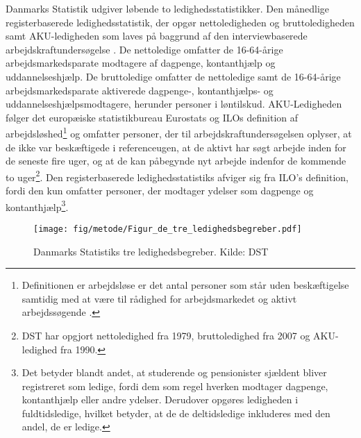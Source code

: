 Danmarks Statistik udgiver løbende to ledighedsstatistikker. Den månedlige registerbaserede ledighedsstatistik, der opgør nettoledigheden og bruttoledigheden samt AKU-ledigheden som laves på baggrund af den interviewbaserede arbejdskraftundersøgelse \parencite{DST2014a}. De nettoledige omfatter de 16-64-årige arbejdsmarkedsparate modtagere af dagpenge, kontanthjælp og uddannelseshjælp. De bruttoledige omfatter de nettoledige samt de 16-64-årige arbejdsmarkedsparate aktiverede dagpenge-, kontanthjælps- og uddannelseshjælpsmodtagere, herunder personer i løntilskud. AKU-Ledigheden følger det europæiske statistikbureau Eurostats og ILOs definition af arbejdsløshed\footnote{Definitionen er arbejdsløse er det antal personer som står uden beskæftigelse samtidig med at være til rådighed for arbejdsmarkedet og aktivt arbejdssøgende \parencite{ILO1982}.} og omfatter personer, der til arbejdskraftundersøgelsen oplyser, at de ikke var beskæftigede i referenceugen, at de aktivt har søgt arbejde inden for de seneste fire uger, og at de kan påbegynde nyt arbejde indenfor de kommende to uger\footnote{DST har opgjort nettoledighed fra 1979, bruttoledighed fra 2007 og AKU-ledighed fra 1990.}. Den registerbaserede ledighedsstatistiks afviger sig fra ILO's definition, fordi den kun omfatter personer, der modtager ydelser som dagpenge og kontanthjælp\footnote{Det betyder blandt andet, at studerende og pensionister sjældent bliver registreret som ledige, fordi dem som regel hverken modtager dagpenge, kontanthjælp eller andre ydelser. Derudover opgøres ledigheden i fuldtidsledige, hvilket betyder, at de de deltidsledige inkluderes med den andel, de er ledige.}.
% 
\begin{figure}[H]
\begin{centering}
	\caption{Danmarks Statistiks tre ledighedsbegreber. Kilde: DST}
	\texttt{[image: fig/metode/Figur\_de\_tre\_ledighedsbegreber.pdf]}
	\label{fig_de_tre_ledighedsbegreber}
\end{centering}
\end{figure}
% 
